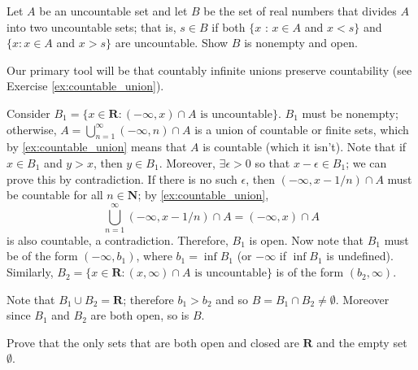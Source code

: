 \begin{exercise}
  Let $A$ be an uncountable set and let $B$ be the set of real numbers that divides $A$ into two uncountable sets; that is, $s \in B$ if both $\{x$ : $x \in A$ and $x<s\}$ and $\{x: x \in A$ and $x>s\}$ are uncountable. Show $B$ is nonempty and open.
\end{exercise}

\begin{solution}
  Our primary tool will be that countably infinite unions preserve countability (see Exercise \ref{ex:countable_union}).

  Consider \(B_1 = \{x \in \mathbf{R} : (-\infty, x) \cap A \text{ is uncountable}\}\). \(B_1\) must be nonempty; otherwise, $A = \bigcup^\infty_{n=1} (-\infty, n) \cap A$ is a union of countable or finite sets, which by \ref{ex:countable_union} means that \(A\) is countable (which it isn't). Note that if \(x \in B_1\) and \(y>x\), then \(y \in B_1\). Moreover, \(\exists \epsilon > 0\) so that \(x - \epsilon \in B_1\); we can prove this by contradiction. If there is no such \(\epsilon\), then \((-\infty, x - 1/n) \cap A\)  must be countable for all \(n \in \mathbf{N}\); by \ref{ex:countable_union},
  \[
  \bigcup_{n=1}^\infty (-\infty, x - 1/n) \cap A = (-\infty, x) \cap A
  \]
  is also countable, a contradiction. Therefore, \(B_1\) is open. Now note that \(B_1\) must be of the form \((-\infty, b_1)\), where \(b_1 = \inf B_1\) (or \(-\infty\) if \(\inf B_1\) is undefined). Similarly, \(B_2 = \{x \in \mathbf{R} : (x, \infty) \cap A \text{ is uncountable}\}\) is of the form \((b_2, \infty)\).

  Note that \(B_1 \cup B_2 = \mathbf{R}\); therefore \(b_1 > b_2\) and so \(B = B_1 \cap B_2 \neq \emptyset\). Moreover since \(B_1\) and \(B_2\) are both open, so is \(B\).
\end{solution}

\begin{exercise}
  Prove that the only sets that are both open and closed are $\mathbf{R}$ and the empty set $\emptyset$.
\end{exercise}

